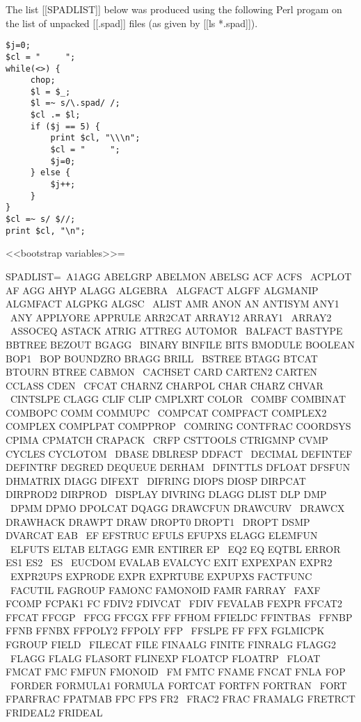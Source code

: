 \documentclass{article}
\begin{document}
The list [[SPADLIST]] below was produced using the following Perl
progam on the list of unpacked [[.spad]] files (as given by [[ls *.spad]]).
\begin{verbatim}
$j=0;
$cl = "     ";
while(<>) {
     chop;
     $l = $_;
     $l =~ s/\.spad/ /;
     $cl .= $l;
     if ($j == 5) {
         print $cl, "\\\n";
         $cl = "     ";
         $j=0;
     } else {
         $j++;
     }
}
$cl =~ s/ $//;
print $cl, "\n";
\end{verbatim}

<<bootstrap variables>>=

SPADLIST=\
     A1AGG ABELGRP ABELMON ABELSG ACF ACFS \
     ACPLOT AF AGG AHYP ALAGG ALGEBRA \
     ALGFACT ALGFF ALGMANIP ALGMFACT ALGPKG ALGSC \
     ALIST AMR ANON AN ANTISYM ANY1 \
     ANY APPLYORE APPRULE ARR2CAT ARRAY12 ARRAY1 \
     ARRAY2 \
     ASSOCEQ ASTACK ATRIG ATTREG AUTOMOR \
     BALFACT BASTYPE BBTREE BEZOUT BGAGG \
     BINARY BINFILE BITS BMODULE BOOLEAN BOP1 \
     BOP BOUNDZRO BRAGG BRILL \
     BSTREE BTAGG BTCAT BTOURN BTREE CABMON \
     CACHSET CARD CARTEN2 CARTEN CCLASS CDEN \
     CFCAT CHARNZ CHARPOL CHAR CHARZ CHVAR \
     CINTSLPE CLAGG CLIF CLIP CMPLXRT COLOR \
     COMBF COMBINAT COMBOPC COMM COMMUPC \
     COMPCAT COMPFACT COMPLEX2 COMPLEX COMPLPAT COMPPROP \
     COMRING CONTFRAC COORDSYS CPIMA CPMATCH CRAPACK \
     CRFP CSTTOOLS CTRIGMNP CVMP CYCLES CYCLOTOM \
     DBASE DBLRESP DDFACT \
     DECIMAL DEFINTEF DEFINTRF DEGRED DEQUEUE DERHAM \
     DFINTTLS DFLOAT DFSFUN DHMATRIX DIAGG DIFEXT \
     DIFRING DIOPS DIOSP DIRPCAT DIRPROD2 DIRPROD \
     DISPLAY DIVRING DLAGG DLIST DLP DMP \
     DPMM DPMO DPOLCAT DQAGG DRAWCFUN DRAWCURV \
     DRAWCX DRAWHACK DRAWPT DRAW DROPT0 DROPT1 \
     DROPT DSMP DVARCAT EAB \
     EF EFSTRUC EFULS EFUPXS ELAGG ELEMFUN \
     ELFUTS ELTAB ELTAGG EMR ENTIRER EP \
     EQ2 EQ EQTBL ERROR ES1 ES2 \
     ES \
     EUCDOM EVALAB EVALCYC EXIT EXPEXPAN EXPR2 \
     EXPR2UPS EXPRODE EXPR EXPRTUBE EXPUPXS FACTFUNC \
     FACUTIL FAGROUP FAMONC FAMONOID FAMR FARRAY \
     FAXF FCOMP FCPAK1 FC FDIV2 FDIVCAT \
     FDIV FEVALAB FEXPR FFCAT2 FFCAT FFCGP \
     FFCG FFCGX FFF FFHOM FFIELDC FFINTBAS \
     FFNBP FFNB FFNBX FFPOLY2 FFPOLY FFP \
     FFSLPE FF FFX FGLMICPK FGROUP FIELD \
     FILECAT FILE FINAALG FINITE FINRALG FLAGG2 \
     FLAGG FLALG FLASORT FLINEXP FLOATCP FLOATRP \
     FLOAT FMCAT FMC FMFUN FMONOID \
     FM FMTC FNAME FNCAT FNLA FOP \
     FORDER FORMULA1 FORMULA FORTCAT FORTFN FORTRAN \
     FORT FPARFRAC FPATMAB FPC FPS FR2 \
     FRAC2 FRAC FRAMALG FRETRCT FRIDEAL2 FRIDEAL \
\end{document}
